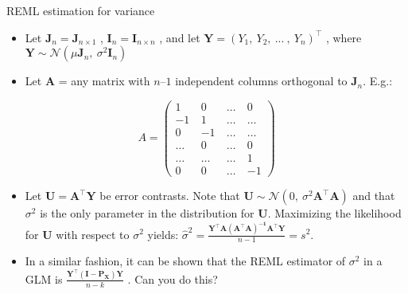 \documentclass[
  9pt,
  ignorenonframetext,
]{beamer}
\begin{document}
\begin{frame}{REML estimation for variance}
\protect\hypertarget{reml-estimation-for-variance}{}
\begin{itemize}
\item
  Let \(\pmb J_n = \pmb J_{n \times 1}\) ,
  \(\pmb I_n = \pmb I_{n \times n}\) , and let
  \(\pmb Y=(Y_1,\ Y_2,\ ...\ ,\ Y_n )^{\top}\) , where
  \(\pmb Y \sim \mathcal N(\mu \pmb J_n,\ \sigma^2 \pmb I_n )\)
\item
  Let \(\pmb A\) = any matrix with \(n–1\) independent columns
  orthogonal to \(\pmb J_n\). E.g.:
\end{itemize}

\[
A = 
\begin{pmatrix}
1\ & 0\ & \dots\ & 0\\ -1\ & 1\ & \dots\ & \dots\\ 0\ & -1\ & \dots\ & \dots\\ \dots\ & 0\ & \dots\ & 0\\ \dots\  & \dots\ & \dots\ & 1\\ 0\ & 0\ & \dots\ &  -1
\end{pmatrix}
\]

\begin{itemize}
\item
  Let \(\pmb U= \pmb A^{\top} \pmb Y\) be error contrasts. Note that
  \(\pmb U \sim \mathcal N(0,\ \sigma^2 \pmb {A^{\top} A})\) and that
  \(\sigma^2\) is the only parameter in the distribution for \(\pmb U\).
  Maximizing the likelihood for \(\pmb U\) with respect to \(\sigma^2\)
  yields:
  \(\hat \sigma^2 = \frac {\pmb {Y^{\top} A(A^{\top} A)^{-1} A^{\top} Y}} {n-1}=s^2\).
\item
  In a similar fashion, it can be shown that the REML estimator of
  \(\sigma^2\) in a GLM is \(\frac {\pmb {Y^{\top} (I - P_X)Y}} {n -k}\)
  . Can you do this?
\end{itemize}
\end{frame}
\end{document}

